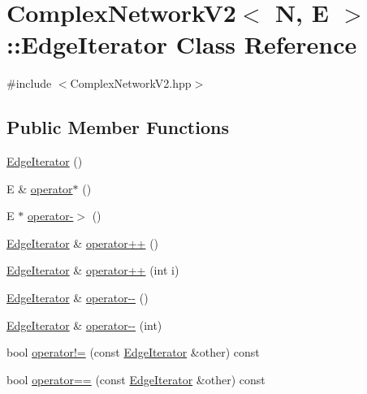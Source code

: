 \hypertarget{class_complex_network_v2_1_1_edge_iterator}{\section{Complex\+Network\+V2$<$ N, E $>$\+:\+:Edge\+Iterator Class Reference}
\label{class_complex_network_v2_1_1_edge_iterator}
}


{\ttfamily \#include $<$Complex\+Network\+V2.\+hpp$>$}

\subsection*{Public Member Functions}
\begin{DoxyCompactItemize}
\item 
\hyperlink{class_complex_network_v2_1_1_edge_iterator_a58f1f66d1b92cf82cea598fb528eb0b5}{Edge\+Iterator} ()
\item 
E \& \hyperlink{class_complex_network_v2_1_1_edge_iterator_aed7b5e234a152bc2335a3692467c0208}{operator$\ast$} ()
\item 
E $\ast$ \hyperlink{class_complex_network_v2_1_1_edge_iterator_ad568232335395201db0593db8b868eae}{operator-\/$>$} ()
\item 
\hyperlink{class_complex_network_v2_1_1_edge_iterator}{Edge\+Iterator} \& \hyperlink{class_complex_network_v2_1_1_edge_iterator_a6a634735e59f08ec12ff97fa54a273a1}{operator++} ()
\item 
\hyperlink{class_complex_network_v2_1_1_edge_iterator}{Edge\+Iterator} \& \hyperlink{class_complex_network_v2_1_1_edge_iterator_a99b961757451f279e2fe8c8ca4e6654f}{operator++} (int i)
\item 
\hyperlink{class_complex_network_v2_1_1_edge_iterator}{Edge\+Iterator} \& \hyperlink{class_complex_network_v2_1_1_edge_iterator_abb61383c3912a0a38b37f715f7f933b4}{operator-\/-\/} ()
\item 
\hyperlink{class_complex_network_v2_1_1_edge_iterator}{Edge\+Iterator} \& \hyperlink{class_complex_network_v2_1_1_edge_iterator_a4889b32f7c565505d32252afc89b34fd}{operator-\/-\/} (int)
\item 
bool \hyperlink{class_complex_network_v2_1_1_edge_iterator_ae41824331e005618bcf1024d42a28ef5}{operator!=} (const \hyperlink{class_complex_network_v2_1_1_edge_iterator}{Edge\+Iterator} \&other) const 
\item 
bool \hyperlink{class_complex_network_v2_1_1_edge_iterator_ab0eb2592846e3b2d2efdb92bf11dc3c0}{operator==} (const \hyperlink{class_complex_network_v2_1_1_edge_iterator}{Edge\+Iterator} \&other) const 

\end{DoxyCompactItemize}
